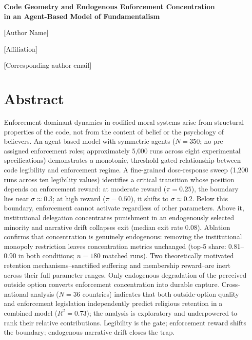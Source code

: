 \documentclass[12pt]{article}
\begin{document}
\begin{center}
{\Large\bfseries Code Geometry and Endogenous Enforcement Concentration\\
in an Agent-Based Model of Fundamentalism}

\bigskip

{[Author Name]}

{[Affiliation]}

{[Corresponding author email]}
\end{center}

%
\section*{Abstract}

Enforcement-dominant dynamics in codified moral systems arise from
structural properties of the code, not from the content of belief or the
psychology of believers. An agent-based model with symmetric agents
($N = 350$; no pre-assigned enforcement roles; approximately 5,000 runs
across eight experimental specifications) demonstrates a monotonic,
threshold-gated relationship between code legibility and enforcement
regime. A fine-grained dose-response sweep (1,200 runs across ten
legibility values) identifies a critical transition whose position
depends on enforcement reward: at moderate reward ($\pi = 0.25$), the
boundary lies near $\sigma \approx 0.3$; at high reward ($\pi = 0.50$),
it shifts to $\sigma \approx 0.2$. Below this boundary, enforcement
cannot activate regardless of other parameters. Above it, institutional
delegation concentrates punishment in an endogenously selected minority
and narrative drift collapses exit (median exit rate 0.08). Ablation
confirms that concentration is genuinely endogenous: removing the
institutional monopoly restriction leaves concentration metrics
unchanged (top-5 share: 0.81--0.90 in both conditions; $n = 180$
matched runs). Two theoretically motivated retention
mechanisms--sanctified suffering and membership reward--are inert
across their full parameter ranges. Only endogenous degradation of the
perceived outside option converts enforcement concentration into durable
capture. Cross-national analysis ($N = 36$ countries) indicates that
both outside-option quality and enforcement legislation independently
predict religious retention in a combined model ($R^2 = 0.73$); the
analysis is exploratory and underpowered to rank their relative
contributions. Legibility is the gate; enforcement reward shifts
the boundary; endogenous narrative drift closes the trap.
\end{document}
